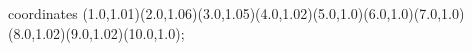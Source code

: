 					coordinates { (1.0,1.01)(2.0,1.06)(3.0,1.05)(4.0,1.02)(5.0,1.0)(6.0,1.0)(7.0,1.0)(8.0,1.02)(9.0,1.02)(10.0,1.0)};
